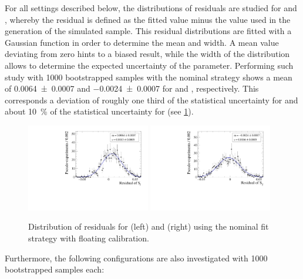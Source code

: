 For all settings described below, the distributions of residuals are studied for \Sf and \Sfbar, whereby the residual is defined as the fitted value minus the value used in the generation  of the simulated sample.
This residual distributions are fitted with a Gaussian function in order to determine the mean and width.
A mean value deviating from zero hints to a biased result, while the width of the distribution allows to determine the expected uncertainty of the parameter.
Performing such study with \num{1000} bootstrapped samples with the nominal strategy shows a mean of \num{0.0064\pm0.0007} and \num{-0.0024\pm0.0007} for \Sf and \Sfbar, respectively.
This corresponds a deviation of roughly one third of the statistical uncertainty for \Sf and about \SI{10}{\percent} of the statistical uncertainty for \Sfbar (see \cref{fig:BootstrapStudy}).
\begin{figure}[tbp]
    \centering
    \includegraphics[width=0.48\textwidth]{09TimeFit/figs/S_f_res.pdf}
    \includegraphics[width=0.48\textwidth]{09TimeFit/figs/S_fbar_res.pdf}
    \caption{Distribution of residuals for \Sf (left) and \Sfbar (right) using the nominal fit strategy with floating calibration.}
    \label{fig:BootstrapStudy}
\end{figure}
Furthermore, the following configurations are also investigated with \num{1000} bootstrapped samples each:

